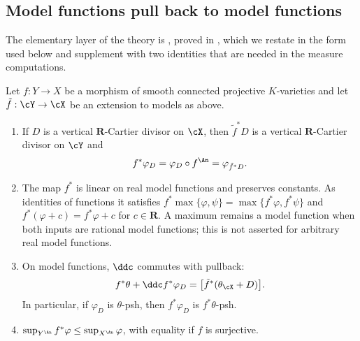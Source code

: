 \subsection{Model functions pull back to model functions}
\label{sec:ch30-pullback-model}

The elementary layer of the theory is , proved in
, which we restate in the form used below and supplement
with two identities that are needed in the measure computations.

\begin{lemma}
\label{lem:ch30-pullback-model-calculus}
Let $f:Y\to X$ be a morphism of smooth connected projective
$K$-varieties and let $\tilde f:\cY\to\cX$ be an extension to models as
above.
\begin{enumerate}
\item\label{itm:ch30-pbm:divisor}
If $D$ is a vertical $\mathbf R$-Cartier divisor on $\cX$, then
$\tilde f^*D$ is a vertical $\mathbf R$-Cartier divisor on $\cY$ and
\begin{equation}
\label{eq:ch30-pullback-model-function}
              f^*\varphi_D=\varphi_D\circ f^{\An}=\varphi_{\tilde f^*D}.
\end{equation}
\item\label{itm:ch30-pbm:linear}
The map $f^*$ is linear on real model functions and preserves constants.
As identities of functions it satisfies
$f^*\max\{\varphi,\psi\}=\max\{f^*\varphi,f^*\psi\}$ and
$f^*(\varphi+c)=f^*\varphi+c$ for $c\in\mathbf R$.
A maximum remains a model function when both inputs are rational model
functions; this is not asserted for arbitrary real model functions.
\item\label{itm:ch30-pbm:ddc}
On model functions, $\ddc$ commutes with pullback:
\begin{equation}
\label{eq:ch30-pullback-ddc}
     f^*\theta+\ddc f^*\varphi_D=\bigl[\tilde f^*(\theta_{\cX}+D)\bigr].
\end{equation}
In particular, if $\varphi_D$ is $\theta$-psh, then $f^*\varphi_D$ is
$f^*\theta$-psh.
\item\label{itm:ch30-pbm:sup}
$\sup_{Y^{\An}}f^*\varphi\leq\sup_{X^{\An}}\varphi$, with equality if
$f$ is surjective.
\end{enumerate}
\end{lemma}

